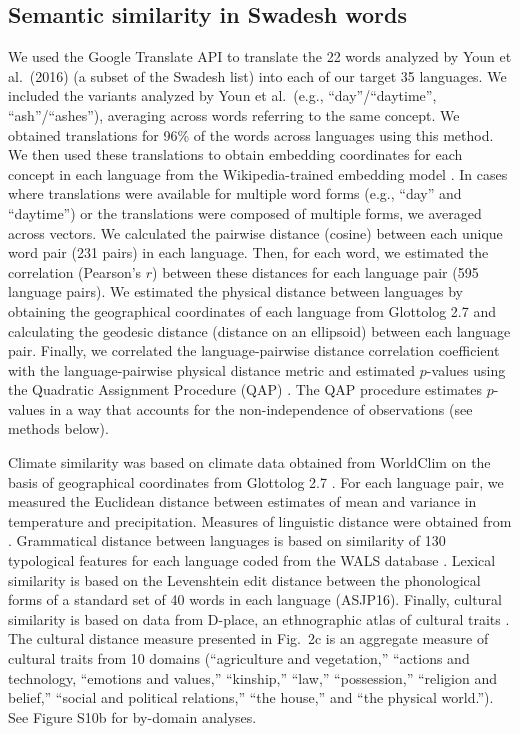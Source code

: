 \documentclass[9pt,twocolumn,twoside,lineno]{pnas-new}
\begin{document}
{\subsection*{Semantic similarity in Swadesh words}
We used the Google Translate  API to translate the 22 words analyzed by Youn et al.\ (2016) \cite{swadesh1952lexico} (a subset of the Swadesh list) into each of our target 35 languages.  We included the variants analyzed by Youn et al.\ (e.g., ``day''/``daytime'', ``ash''/``ashes''), averaging across words referring to the same concept. We obtained translations for 96\% of the words across languages using this method. We then used these translations to obtain embedding coordinates for each concept in each language from the Wikipedia-trained embedding model \cite{bojanowski2016enriching}. In cases where translations were available for multiple word forms (e.g., ``day'' and ``daytime'') or the translations were composed of multiple forms, we averaged across vectors.  We  calculated the  pairwise distance (cosine) between each unique word pair (231 pairs)  in each language. Then, for each word, we estimated the correlation (Pearson's $r$) between these distances for  each language pair (595 language pairs). We estimated the physical distance between languages by obtaining the geographical coordinates of each language from Glottolog 2.7 \cite{HammarstroemEtAl2011Oslo} and calculating the geodesic distance (distance on an ellipsoid) between each language pair. Finally, we correlated the language-pairwise distance correlation coefficient with the language-pairwise physical distance metric and estimated $p$-values using the Quadratic Assignment Procedure (QAP) \cite{snapackage}. The QAP procedure estimates $p$-values in a way that accounts for the non-independence of observations (see methods below).

 Climate similarity was based on climate data obtained from WorldClim \cite{fick2017worldclim} on the basis of geographical coordinates from Glottolog 2.7 \cite{HammarstroemEtAl2011Oslo}. For each language pair, we  measured the Euclidean distance between estimates of mean and variance in temperature and precipitation. Measures of linguistic distance were obtained from \cite{dediu2018trees}. Grammatical distance between languages is based on similarity of 130 typological features for each language coded from the WALS database \cite{wals2013}.  Lexical similarity is based on the Levenshtein edit distance between the phonological forms of a standard set of 40 words in each language \cite{wichmann_asjp_2013} (ASJP16). Finally, cultural similarity is based on data from D-place, an ethnographic atlas of cultural traits \cite{kirby2016d,thompson2020cultural}. The cultural distance measure presented in Fig.\ 2c is an aggregate measure of cultural traits from 10 domains (``agriculture and vegetation,'' ``actions and technology, ``emotions and values,'' ``kinship,'' ``law,'' ``possession,'' ``religion and belief,'' ``social and political relations,'' ``the house,'' and ``the physical world.''). See Figure S10b for by-domain analyses. 

}
\end{document}
